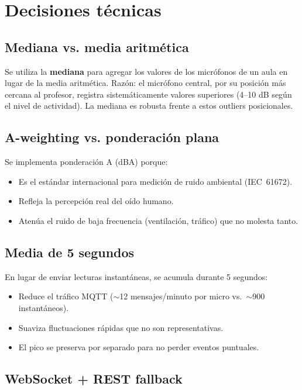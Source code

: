 \documentclass[12pt,a4paper]{report}
\begin{document}
\chapter{Decisiones t\'ecnicas}

\section{Mediana vs. media aritm\'etica}

Se utiliza la \textbf{mediana} para agregar los valores de los micr\'ofonos de un aula en lugar de la media aritm\'etica. Raz\'on: el micr\'ofono central, por su posici\'on m\'as cercana al profesor, registra sistem\'aticamente valores superiores (4--10 dB seg\'un el nivel de actividad). La mediana es robusta frente a estos outliers posicionales.

\section{A-weighting vs. ponderaci\'on plana}

Se implementa ponderaci\'on A (dBA) porque:
\begin{itemize}
    \item Es el est\'andar internacional para medici\'on de ruido ambiental (IEC~61672).
    \item Refleja la percepci\'on real del o\'ido humano.
    \item Aten\'ua el ruido de baja frecuencia (ventilaci\'on, tr\'afico) que no molesta tanto.
\end{itemize}

\section{Media de 5 segundos}

En lugar de enviar lecturas instant\'aneas, se acumula durante 5 segundos:
\begin{itemize}
    \item Reduce el tr\'afico MQTT ($\sim$12 mensajes/minuto por micro vs.\ $\sim$900 instant\'aneos).
    \item Suaviza fluctuaciones r\'apidas que no son representativas.
    \item El pico se preserva por separado para no perder eventos puntuales.
\end{itemize}

\section{WebSocket + REST fallback}
\end{document}
